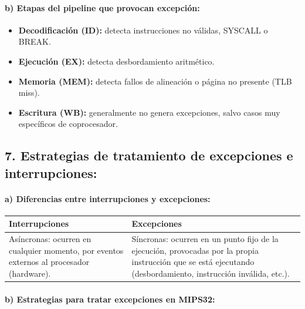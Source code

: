 \documentclass[12pt]{article}
\begin{document}
\paragraph*{b) Etapas del pipeline que provocan excepción:}

\begin{itemize}
    \item \textbf{Decodificación (ID):} detecta instrucciones no válidas, SYSCALL o BREAK.
    \item \textbf{Ejecución (EX):} detecta desbordamiento aritmético.
    \item \textbf{Memoria (MEM):} detecta fallos de alineación o página no presente (TLB miss).
    \item \textbf{Escritura (WB):} generalmente no genera excepciones, salvo casos muy específicos de coprocesador.
\end{itemize}

\begin{center}
\subsection*{7. Estrategias de tratamiento de excepciones e interrupciones:}
\end{center}

\paragraph*{a) Diferencias entre interrupciones y excepciones:}

\begin{center}
\begin{tabular}{|p{5.5cm}|p{5.5cm}|}
\hline
\textbf{Interrupciones} & \textbf{Excepciones} \\ \hline
Asíncronas: ocurren en cualquier momento, por eventos externos al procesador (hardware). & Síncronas: ocurren en un punto fijo de la ejecución, provocadas por la propia instrucción que se está ejecutando (desbordamiento, instrucción inválida, etc.). \\ \hline
\end{tabular}
\end{center}

\paragraph*{b) Estrategias para tratar excepciones en MIPS32:}

\vspace{0.3cm}
\end{document}
